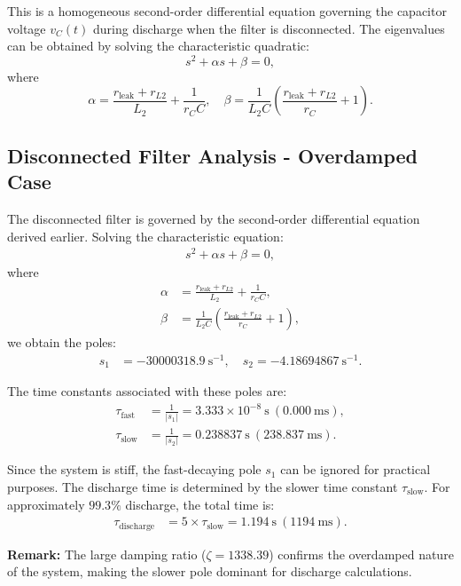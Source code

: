 \vspace{1em}
This is a homogeneous second-order differential equation governing the capacitor voltage $v_C(t)$ during discharge when the filter is disconnected. The eigenvalues can be obtained by solving the characteristic quadratic:
\[
s^2 + \alpha s + \beta = 0,
\]
where
\[
\alpha = \frac{r_{\text{leak}} + r_{L2}}{L_2} + \frac{1}{r_C C}, 
\quad
\beta = \frac{1}{L_2 C} \left(\frac{r_{\text{leak}} + r_{L2}}{r_C} + 1\right).
\]

\subsection*{Disconnected Filter Analysis - Overdamped Case}
The disconnected filter is governed by the second-order differential equation derived earlier. Solving the characteristic equation:
\begin{align*}
    s^2 + \alpha s + \beta = 0,
\end{align*}
where
\begin{align*}
    \alpha &= \frac{r_{\text{leak}} + r_{L2}}{L_2} + \frac{1}{r_C C}, \\
    \beta &= \frac{1}{L_2 C} \left(\frac{r_{\text{leak}} + r_{L2}}{r_C} + 1\right),
\end{align*}
we obtain the poles:
\begin{align*}
    s_1 &= -30000318.9~\text{s}^{-1}, \quad s_2 = -4.18694867~\text{s}^{-1}.
\end{align*}

The time constants associated with these poles are:
\begin{align*}
    \tau_{\text{fast}} &= \frac{1}{|s_1|} = 3.333 \times 10^{-8}~\text{s}~(0.000~\text{ms}), \\
    \tau_{\text{slow}} &= \frac{1}{|s_2|} = 0.238837~\text{s}~(238.837~\text{ms}).
\end{align*}

Since the system is stiff, the fast-decaying pole $s_1$ can be ignored for practical purposes. The discharge time is determined by the slower time constant $\tau_{\text{slow}}$. For approximately $99.3\%$ discharge, the total time is:
\begin{align*}
    \tau_{\text{discharge}} &= 5 \times \tau_{\text{slow}} = \boxed{1.194~\text{s}~(1194~\text{ms})}.
\end{align*}

\textbf{Remark:} The large damping ratio ($\zeta = 1338.39$) confirms the overdamped nature of the system, making the slower pole dominant for discharge calculations.

